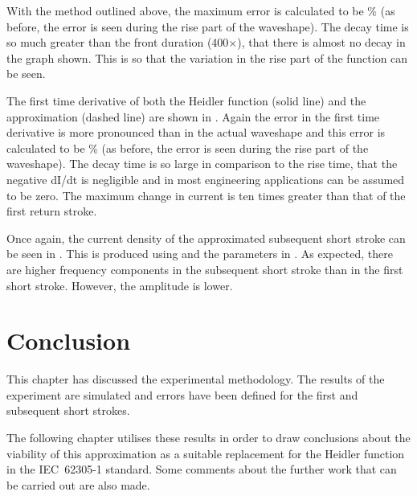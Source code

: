 With the method outlined above, the maximum error is calculated to be \unskip \% (as before, the error is seen during the rise part of the waveshape). The decay time is so much greater than the front duration (400$\times$), that there is almost no decay in the graph shown. This is so that the variation in the rise part of the function can be seen.

The first time derivative of both the Heidler function (solid line) and the approximation (dashed line) are shown in .
Again the error in the first time derivative is more pronounced than in the actual waveshape and this error is calculated to be \unskip \% (as before, the error is seen during the rise part of the waveshape). The decay time is so large in comparison to the rise time, that the negative dI/dt is negligible and in most engineering applications can be assumed to be zero. The maximum change in current is ten times greater than that of the first return stroke.

Once again, the current density of the approximated subsequent short stroke can be seen in . This is produced using  and the parameters in . As expected, there are higher frequency components in the subsequent short stroke than in the first short stroke. However, the amplitude is lower.


\section{Conclusion}
\label{sec:results_conclusion}
This chapter has discussed the experimental methodology. The results of the experiment are simulated and errors have been defined for the first and subsequent short strokes.

The following chapter utilises these results in order to draw conclusions about the viability of this approximation as a suitable replacement for the Heidler function in the IEC~62305-1 standard. Some comments about the further work that can be carried out are also made.
